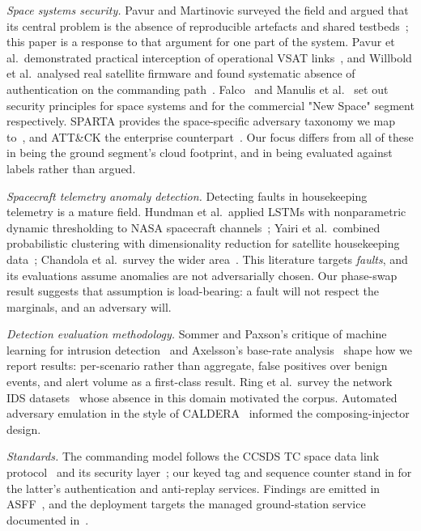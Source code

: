 \documentclass[conference]{IEEEtran}
\begin{document}
\emph{Space systems security.} Pavur and Martinovic surveyed the field and
argued that its central problem is the absence of reproducible artefacts and
shared testbeds~\cite{pavur2020sok}; this paper is a response to that argument
for one part of the system. Pavur et al.\ demonstrated practical interception of
operational VSAT links~\cite{pavur2020vsat}, and Willbold et al.\ analysed real
satellite firmware and found systematic absence of authentication on the
commanding path~\cite{willbold2023space}. Falco~\cite{falco2019principles} and
Manulis et al.~\cite{manulis2021newspace} set out security principles for space
systems and for the commercial "New Space" segment respectively. SPARTA
provides the space-specific adversary taxonomy we map to~\cite{sparta}, and
ATT\&CK the enterprise counterpart~\cite{attack}. Our focus differs from all of
these in being the ground segment's cloud footprint, and in being evaluated
against labels rather than argued.

\emph{Spacecraft telemetry anomaly detection.} Detecting faults in housekeeping
telemetry is a mature field. Hundman et al.\ applied LSTMs with nonparametric
dynamic thresholding to NASA spacecraft channels~\cite{hundman2018lstm}; Yairi
et al.\ combined probabilistic clustering with dimensionality reduction for
satellite housekeeping data~\cite{yairi2017datadriven}; Chandola et al.\ survey
the wider area~\cite{chandola2009survey}. This literature targets \emph{faults},
and its evaluations assume anomalies are not adversarially chosen. Our phase-swap
result suggests that assumption is load-bearing: a fault will not respect the
marginals, and an adversary will.

\emph{Detection evaluation methodology.} Sommer and Paxson's critique of machine
learning for intrusion detection~\cite{sommer2010closedworld} and Axelsson's
base-rate analysis~\cite{axelsson2000baserate} shape how we report results:
per-scenario rather than aggregate, false positives over benign events, and
alert volume as a first-class result. Ring et al.\ survey the network IDS
datasets~\cite{ring2019datasets} whose absence in this domain motivated the
corpus. Automated adversary emulation in the style of
CALDERA~\cite{applebaum2016caldera} informed the composing-injector design.

\emph{Standards.} The commanding model follows the CCSDS TC space data link
protocol~\cite{ccsds232} and its security layer~\cite{ccsds355}; our keyed tag
and sequence counter stand in for the latter's authentication and anti-replay
services. Findings are emitted in ASFF~\cite{asff}, and the deployment targets
the managed ground-station service documented in~\cite{awsgroundstation}.
\end{document}
